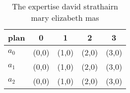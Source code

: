 \documentclass[a4paper]{article}
\begin{document}
\begin{table}
\begin{adjustbox}{width=0.5\columnwidth}
\begin{tabular}{|l|l|l|l|l|}
\hline
\textbf{plan} & \multicolumn{1}{c|}{\textbf{0}} & \multicolumn{1}{c|}{\textbf{1}} & \multicolumn{1}{c|}{\textbf{2}} & \multicolumn{1}{c|}{\textbf{3}} \\ \hline
\textbf{$a_0$}  & (0,0) & (1,0) & (2,0) & (3,0) \\ \hline
\textbf{$a_1$}  & (0,0) & (1,0) & (2,0) & (3,0) \\ \hline
\textbf{$a_2$}  & (0,0) & (1,0) & (2,0) & (3,0) \\ \hline
\end{tabular}
\end{adjustbox}
\caption{The expertise david strathairn mary elizabeth mas
}
\end{table}
\end{document}
